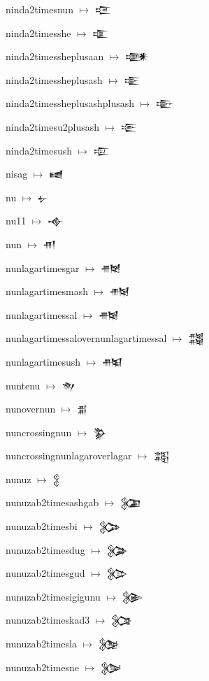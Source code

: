 {\noindent ninda2timesnun $\mapsto$ {\cufont 𒉙}\par
\noindent ninda2timesshe $\mapsto$ {\cufont 𒉚}\par
\noindent ninda2timessheplusaan $\mapsto$ {\cufont 𒉛}\par
\noindent ninda2timessheplusash $\mapsto$ {\cufont 𒉜}\par
\noindent ninda2timessheplusashplusash $\mapsto$ {\cufont 𒉝}\par
\noindent ninda2timesu2plusash $\mapsto$ {\cufont 𒉞}\par
\noindent ninda2timesush $\mapsto$ {\cufont 𒉟}\par
\noindent nisag $\mapsto$ {\cufont 𒉠}\par
\noindent nu $\mapsto$ {\cufont 𒉡}\par
\noindent nu11 $\mapsto$ {\cufont 𒉢}\par
\noindent nun $\mapsto$ {\cufont 𒉣}\par
\noindent nunlagartimesgar $\mapsto$ {\cufont 𒉤}\par
\noindent nunlagartimesmash $\mapsto$ {\cufont 𒉥}\par
\noindent nunlagartimessal $\mapsto$ {\cufont 𒉦}\par
\noindent nunlagartimessalovernunlagartimessal $\mapsto$ {\cufont 𒉧}\par
\noindent nunlagartimesush $\mapsto$ {\cufont 𒉨}\par
\noindent nuntenu $\mapsto$ {\cufont 𒉩}\par
\noindent nunovernun $\mapsto$ {\cufont 𒉪}\par
\noindent nuncrossingnun $\mapsto$ {\cufont 𒉫}\par
\noindent nuncrossingnunlagaroverlagar $\mapsto$ {\cufont 𒉬}\par
\noindent nunuz $\mapsto$ {\cufont 𒉭}\par
\noindent nunuzab2timesashgab $\mapsto$ {\cufont 𒉮}\par
\noindent nunuzab2timesbi $\mapsto$ {\cufont 𒉯}\par
\noindent nunuzab2timesdug $\mapsto$ {\cufont 𒉰}\par
\noindent nunuzab2timesgud $\mapsto$ {\cufont 𒉱}\par
\noindent nunuzab2timesigigunu $\mapsto$ {\cufont 𒉲}\par
\noindent nunuzab2timeskad3 $\mapsto$ {\cufont 𒉳}\par
\noindent nunuzab2timesla $\mapsto$ {\cufont 𒉴}\par
\noindent nunuzab2timesne $\mapsto$ {\cufont 𒉵}\par
}
